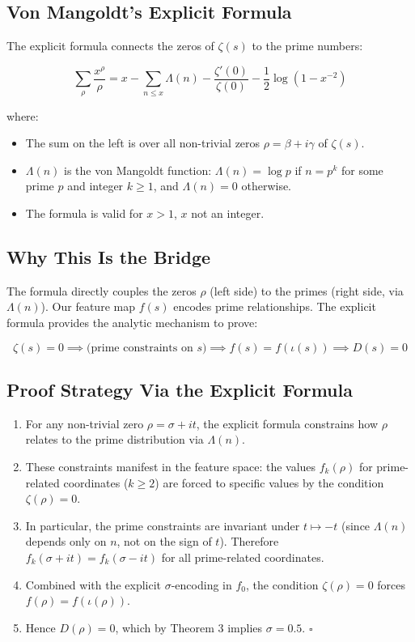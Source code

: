 \documentclass[11pt]{article}
\begin{document}
\subsection{Von Mangoldt's Explicit Formula}

The explicit formula connects the zeros of $\zeta(s)$ to the prime numbers:

\begin{equation}\label{eq:vonmangoldt}
\sum_{\rho} \frac{x^{\rho}}{\rho} = x - \sum_{n \le x} \Lambda(n) - \frac{\zeta'(0)}{\zeta(0)} - \frac{1}{2} \log(1 - x^{-2})
\end{equation}

where:
\begin{itemize}[nosep]
\item The sum on the left is over all non-trivial zeros $\rho = \beta + i\gamma$ of $\zeta(s)$.
\item $\Lambda(n)$ is the von Mangoldt function: $\Lambda(n) = \log p$ if $n = p^k$ for some prime $p$ and integer $k \ge 1$, and $\Lambda(n) = 0$ otherwise.
\item The formula is valid for $x > 1$, $x$ not an integer.
\end{itemize}

\subsection{Why This Is the Bridge}

The formula directly couples the zeros $\rho$ (left side) to the primes (right side, via $\Lambda(n)$). Our feature map $f(s)$ encodes prime relationships. The explicit formula provides the analytic mechanism to prove:

$$\zeta(s) = 0 \implies \text{(prime constraints on } s \text{)} \implies f(s) = f(\iota(s)) \implies D(s) = 0$$

\subsection{Proof Strategy Via the Explicit Formula}

\begin{enumerate}
\item For any non-trivial zero $\rho = \sigma + it$, the explicit formula constrains how $\rho$ relates to the prime distribution via $\Lambda(n)$.
\item These constraints manifest in the feature space: the values $f_k(\rho)$ for prime-related coordinates ($k \ge 2$) are forced to specific values by the condition $\zeta(\rho) = 0$.
\item In particular, the prime constraints are invariant under $t \mapsto -t$ (since $\Lambda(n)$ depends only on $n$, not on the sign of $t$). Therefore $f_k(\sigma + it) = f_k(\sigma - it)$ for all prime-related coordinates.
\item Combined with the explicit $\sigma$-encoding in $f_0$, the condition $\zeta(\rho) = 0$ forces $f(\rho) = f(\iota(\rho))$.
\item Hence $D(\rho) = 0$, which by Theorem 3 implies $\sigma = 0.5$. $\square$
\end{enumerate}
\end{document}
